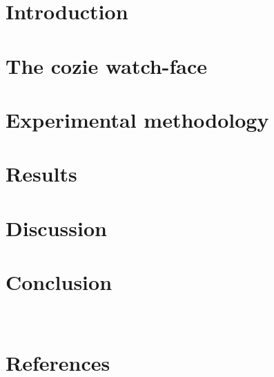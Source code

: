 \documentclass[a4paper]{jpconf} %
\begin{document}


\section{Introduction}
\label{ch:introduction}


\section{The cozie watch-face}
\label{ch:cozie}


\section{Experimental methodology}
\label{ch:method}


\section{Results}
\label{ch:results}



\section{Discussion}
\label{ch:discussion}


\section{Conclusion}
\label{ch:conclusion}
\\

% 

%  


\section*{References}
   
  
\end{document}
